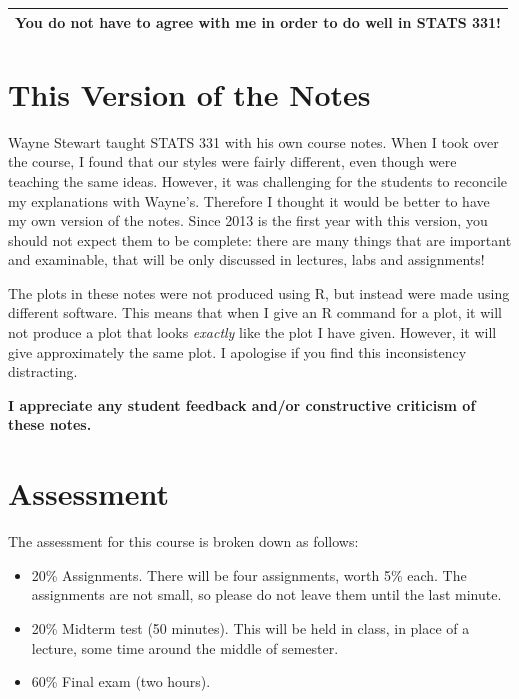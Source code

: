 \begin{center}
\begin{tabular}{|c|}
\hline
{\bf You do not have to agree with me in order to do well in STATS 331!}\\
\hline
\end{tabular}
\end{center}

\section{This Version of the Notes}
Wayne Stewart taught STATS 331 with his own course notes. When I took over the
course, I found that our styles were fairly different, even though were teaching
the same ideas. However, it was challenging for the students to reconcile
my explanations with Wayne's. Therefore I thought it would be better to have
my own version of the notes. Since 2013 is the first year with this version, you
should not expect them to be complete: there are many things that are important
and examinable, that will be only discussed in lectures, labs and assignments!

The plots in these notes were not produced using R, but instead were made using
different software. This means that when I give an R command for a plot,
it will not produce a plot that looks {\it exactly} like the plot I have given.
However, it will give approximately the same plot. I apologise if you find this
inconsistency distracting.

\begin{framed}
\begin{center}
{\bf 
I appreciate any student feedback and/or constructive criticism of these notes.
}
\end{center}
\end{framed}

\section{Assessment}
The assessment for this course is broken down as follows:
\begin{itemize}
\item 20\% Assignments. There will be four assignments, worth 5\% each. The
assignments are not small, so please do not leave them until the last minute.
\item 20\% Midterm test (50 minutes). This will be held in class, in place of
a lecture, some time around the middle of semester.
\item 60\% Final exam (two hours).
\end{itemize}

